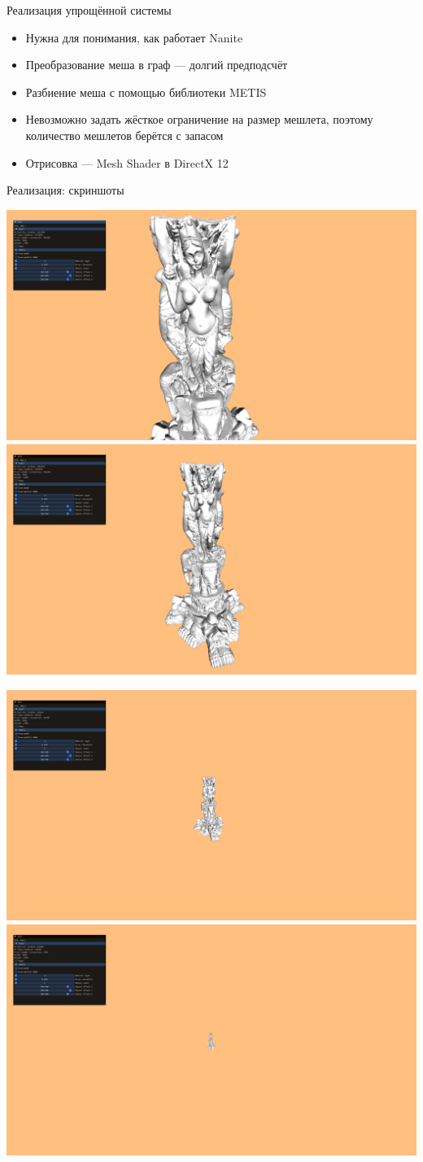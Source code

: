 \begin{frame}{Реализация упрощённой системы}
    \begin{itemize}
        \item Нужна для понимания, как работает Nanite
        \item Преобразование меша в граф --- долгий предподсчёт
        \item Разбиение меша с помощью библиотеки METIS
        \item Невозможно задать жёсткое ограничение на размер мешлета, поэтому количество мешлетов берётся с запасом
        \item Отрисовка --- Mesh Shader в DirectX 12
    \end{itemize}
\end{frame}

\begin{frame}{Реализация: скриншоты}
    \begin{center}
        \includegraphics[width=.45\textwidth]{../Text/pics/example-0.png}
        \includegraphics[width=.45\textwidth]{../Text/pics/example-1.png}

        \includegraphics[width=.45\textwidth]{../Text/pics/example-2.png}
        \includegraphics[width=.45\textwidth]{../Text/pics/example-3.png}
    \end{center}
\end{frame}
